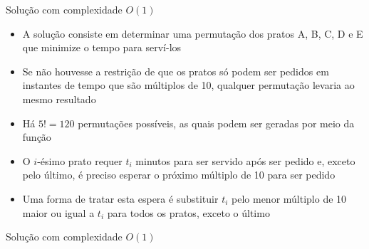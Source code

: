 \begin{frame}[fragile]{Solução com complexidade $O(1)$}

    \begin{itemize}
        \item A solução consiste em determinar uma permutação dos pratos A, B, C, D e E que 
            minimize o tempo para serví-los

        \item Se não houvesse a restrição de que os pratos só podem ser pedidos em instantes de
            tempo que são múltiplos de 10, qualquer permutação levaria ao mesmo resultado

        \item Há $5! = 120$ permutações possíveis, as quais podem ser geradas por meio da 
            função 

        \item O $i$-ésimo prato requer $t_i$ minutos para ser servido após ser pedido e, exceto
            pelo último, é preciso esperar o próximo múltiplo de 10 para ser pedido

        \item Uma forma de tratar esta espera é substituir $t_i$ pelo menor múltiplo de 10 maior
            ou igual a $t_i$ para todos os pratos, exceto o último
    \end{itemize}

\end{frame}

\begin{frame}[fragile]{Solução com complexidade $O(1)$}
\end{frame}
